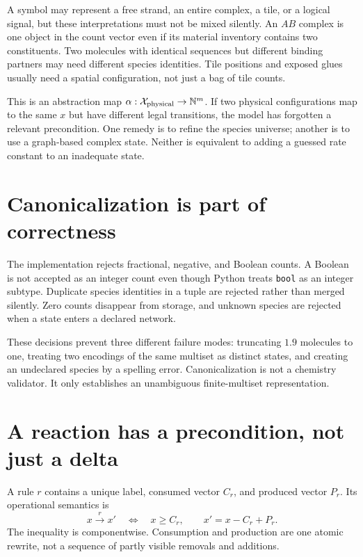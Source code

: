 A symbol may represent a free strand, an entire complex, a tile, or a logical
signal, but these interpretations must not be mixed silently. An $AB$ complex is
one object in the count vector even if its material inventory contains two
constituents. Two molecules with identical sequences but different binding
partners may need different species identities. Tile positions and exposed glues
usually need a spatial configuration, not just a bag of tile counts.

This is an abstraction map $\alpha:\mathcal X_{\rm physical}\to\mathbb N^m$.
If two physical configurations map to the same $x$ but have different legal
transitions, the model has forgotten a relevant precondition. One remedy is to
refine the species universe; another is to use a graph-based complex state. Neither
is equivalent to adding a guessed rate constant to an inadequate state.

\section{Canonicalization is part of correctness}
The implementation rejects fractional, negative, and Boolean counts. A Boolean is
not accepted as an integer count even though Python treats \texttt{bool} as an
integer subtype. Duplicate species identities in a tuple are rejected rather than
merged silently. Zero counts disappear from storage, and unknown species are
rejected when a state enters a declared network.

These decisions prevent three different failure modes: truncating $1.9$ molecules
to one, treating two encodings of the same multiset as distinct states, and creating
an undeclared species by a spelling error. Canonicalization is not a chemistry
validator. It only establishes an unambiguous finite-multiset representation.

\section{A reaction has a precondition, not just a delta}
A rule $r$ contains a unique label, consumed vector $C_r$, and produced vector
$P_r$. Its operational semantics is
\[
x\xrightarrow{r}x'\quad\Longleftrightarrow\quad
x\ge C_r,\qquad x'=x-C_r+P_r.
\]
The inequality is componentwise. Consumption and production are one atomic rewrite,
not a sequence of partly visible removals and additions.


